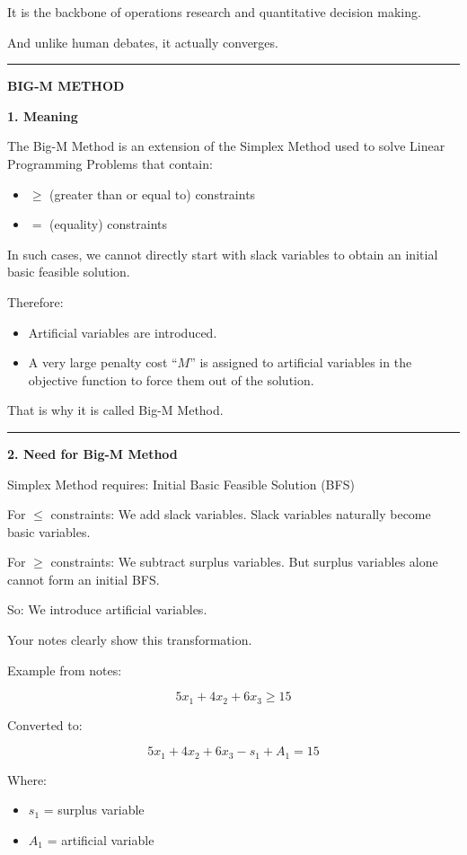 \documentclass[10pt,a4paper]{article}
\newcommand{\separator}{\vspace{0.4em}\noindent\rule{\linewidth}{0.6pt}\vspace{0.4em}}
\begin{document}
It is the backbone of operations research and quantitative decision making.

And unlike human debates, it actually converges.

\separator

\begin{center}
  \large\textbf{BIG-M METHOD}
\end{center}

\textbf{1. Meaning}

The Big-M Method is an extension of the Simplex Method used to solve Linear Programming
Problems that contain:
\begin{itemize}
  \item $\geq$ (greater than or equal to) constraints
  \item $=$ (equality) constraints
\end{itemize}

In such cases, we cannot directly start with slack variables to obtain an initial basic feasible
solution.

Therefore:
\begin{itemize}
  \item Artificial variables are introduced.
  \item A very large penalty cost ``$M$'' is assigned to artificial variables in the objective function to force them out of the solution.
\end{itemize}

That is why it is called Big-M Method.

\separator

\textbf{2. Need for Big-M Method}

Simplex Method requires: Initial Basic Feasible Solution (BFS)

For $\leq$ constraints: We add slack variables. Slack variables naturally become basic
variables.

For $\geq$ constraints: We subtract surplus variables. But surplus variables alone cannot
form an initial BFS.

So: We introduce artificial variables.

Your notes clearly show this transformation.

Example from notes:

\[
5x_1 + 4x_2 + 6x_3 \geq 15
\]

Converted to:

\[
5x_1 + 4x_2 + 6x_3 - s_1 + A_1 = 15
\]

Where:
\begin{itemize}
  \item $s_1$ = surplus variable
  \item $A_1$ = artificial variable
\end{itemize}
\end{document}

